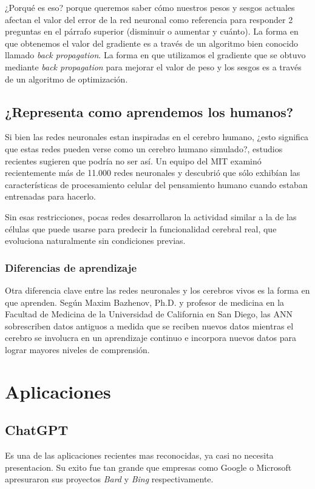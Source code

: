 \documentclass[runningheads]{llncs} %
\begin{document}
¿Porqué es eso? porque queremos saber cómo nuestros pesos y sesgos actuales afectan 
el valor del error de la red neuronal como referencia para responder 2 preguntas 
en el párrafo superior (disminuir o aumentar y cuánto). La forma en que obtenemos el valor 
del gradiente es a través de un algoritmo bien conocido llamado \textit{back propagation}. 
La forma en que utilizamos el gradiente que se obtuvo mediante \textit{back propagation} 
para mejorar el valor de peso y los sesgos es a través de un algoritmo de optimización.
\cite{backpropagation}

\subsection{¿Representa como aprendemos los humanos?}
Si bien las redes neuronales estan inspiradas en el cerebro humano, ¿esto significa 
que estas redes pueden verse como un cerebro humano simulado?, estudios recientes sugieren 
que podría no ser así. Un equipo del MIT examinó recientemente más de 11.000 redes neuronales 
y descubrió que sólo exhibían las características de procesamiento celular del pensamiento 
humano cuando estaban entrenadas para hacerlo. 

Sin esas restricciones, pocas redes desarrollaron la actividad similar a la de las células 
que puede usarse para predecir la funcionalidad cerebral real, que evoluciona naturalmente 
sin condiciones previas. \cite{NNvsANN}

\subsubsection{Diferencias de aprendizaje} 
Otra diferencia clave entre las redes neuronales y los cerebros vivos es la forma 
en que aprenden. Según Maxim Bazhenov, Ph.D. y profesor de medicina en la 
Facultad de Medicina de la Universidad de California en San Diego, 
las ANN sobrescriben datos antiguos a medida que se reciben nuevos datos mientras 
el cerebro se involucra en un aprendizaje continuo e incorpora nuevos datos para lograr 
mayores niveles de comprensión. \cite{NNvsANN}

\newpage
\section{Aplicaciones}
\subsection{ChatGPT}
Es una de las aplicaciones recientes mas reconocidas, ya casi no necesita presentacion.
Su exito fue tan grande que empresas como Google o Microsoft apresuraron sus proyectos
\textit{Bard} y \textit{Bing} respectivamente.
\end{document}
